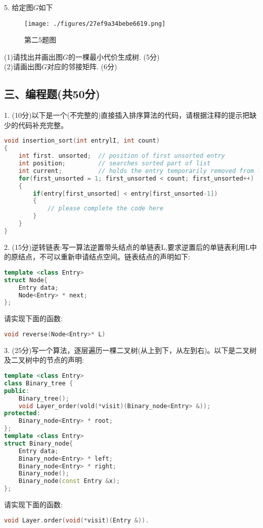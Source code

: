 5. 给定图$G$如下
\begin{figure}[ht]
\centering
\texttt{[image: ./figures/27ef9a34bebe6619.png]}
\caption{第二5题图} \label{fig_SYDS15_1}
\end{figure}
(1)请找出并画出图$G$的一棵最小代价生成树. (5分) \\
(2)请画出图$G$对应的邻接矩阵. (6分)

\subsection{三、编程题(共50分)}
1. (10分)以下是一个(不完整的)直接插入排序算法的代码，请根据注释的提示把缺少的代码补充完整。
\begin{lstlisting}[language=cpp]
void insertion_sort(int entrylI, int count)
{
    int first. unsorted;  // position of first unsorted entry
    int position;         // searches sorted part of list
    int current;          // holds the entry temporarily removed from list
    for(first_unsorted = 1; first_unsorted < count; first_unsorted++)
    {
        if(entry[first_unsorted] < entry[first_unsorted-1])
        {
            // please complete the code here
        }
    }
}
\end{lstlisting}

2. (15分)逆转链表:写一算法逆置带头结点的单链表L,要求逆置后的单链表利用L中的原结点，不可以重新申请结点空间。链表结点的声明如下:
\begin{lstlisting}[language=cpp]
template <class Entry>
struct Node{
    Entry data;
    Node<Entry> * next;
};
\end{lstlisting}
请实现下面的函数:
\begin{lstlisting}[language=cpp]
void reverse(Node<Entry>* L)
\end{lstlisting}

3. (25分)写一个算法，逐层遍历一棵二叉树(从上到下，从左到右)。以下是二叉树及二叉树中的节点的声明:
\begin{lstlisting}[language=cpp]
template <class Entry>
class Binary_tree {
public:
    Binary_tree();
    void Layer_order(vold(*visit)(Binary_node<Entry> &));
protected:
    Binary_node<Entry> * root;
};
template <class Entry>
struct Binary_node{
    Entry data;
    Binary_node<Entry> * left;
    Binary_node<Entry> * right;
    Binary_node();
    Binary_node(const Entry &x);
};
\end{lstlisting}
请实现下面的函数:
\begin{lstlisting}[language=cpp]
void Layer.order(void(*visit)(Entry &)).
\end{lstlisting}